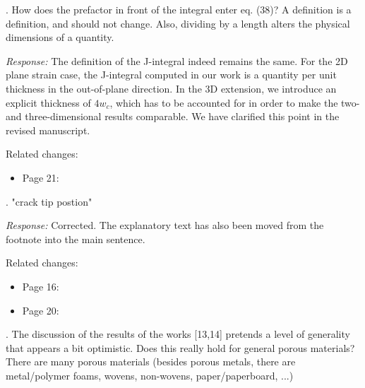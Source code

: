 \documentclass[pdflatex,sn-mathphys-num]{sn-jnl}
\begin{document}
\bigskip

. How does the prefactor in front of the integral enter eq. (38)? A definition is a definition, and should not change. Also, dividing by a length alters the physical dimensions of a quantity.

\emph{Response:} The definition of the J-integral indeed remains the same. For the 2D plane strain case, the J-integral computed in our work is a quantity per unit thickness in the out-of-plane direction. In the 3D extension, we introduce an explicit thickness of $4w_c$, which has to be accounted for in order to make the two- and three-dimensional results comparable. We have clarified this point in the revised manuscript.

Related changes:
\begin{itemize}
\item Page 21: 
\end{itemize}
\bigskip

. "crack tip postion"

\emph{Response:} Corrected. The explanatory text has also been moved from the footnote into the main sentence.

Related changes:
\begin{itemize}
\item Page 16:  
\item Page 20:  
\end{itemize}

\bigskip

. The discussion of the results of the works [13,14] pretends a level of generality that appears a bit optimistic. Does this really hold for general porous materials? There are many porous materials (besides porous metals, there are metal/polymer foams, wovens, non-wovens, paper/paperboard, ...)
\end{document}
